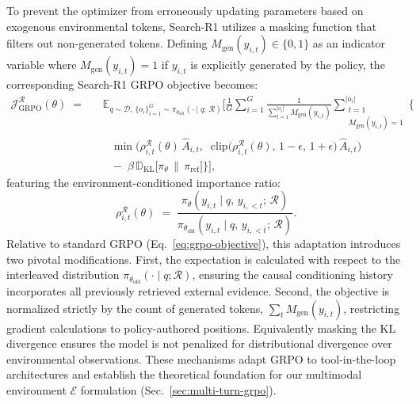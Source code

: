 To prevent the optimizer from erroneously updating parameters based on exogenous environmental tokens, Search-R1 utilizes a masking function that filters out non-generated tokens. Defining $M_{\text{gen}}(y_{i,t}) \in \{0, 1\}$ as an indicator variable where $M_{\text{gen}}(y_{i,t}) = 1$ if $y_{i,t}$ is explicitly generated by the policy, the corresponding Search-R1 GRPO objective becomes:
\begin{equation}
\begin{aligned}
    \mathcal{J}_{\text{GRPO}}^{\mathcal{R}}(\theta)
    \;=\;&\;\; \mathbb{E}_{q \sim \mathcal{D},\, \{o_i\}_{i=1}^{G} \sim \pi_{\theta_{\text{old}}}(\cdot\mid q;\,\mathcal{R})}
    \Bigg[
    \frac{1}{G} \sum_{i=1}^{G}
    \frac{1}{\sum_{t=1}^{|o_i|} M_{\text{gen}}(y_{i,t})}
    \sum_{\substack{t=1 \\ M_{\text{gen}}(y_{i,t})=1}}^{|o_i|} \bigg\{ \\
    &\quad\; \min\!\Big( \rho_{i,t}^{\mathcal{R}}(\theta)\,\hat{A}_{i,t},\;\;
    \mathrm{clip}\bigl(\rho_{i,t}^{\mathcal{R}}(\theta),\,1{-}\epsilon,\,1{+}\epsilon\bigr)\,\hat{A}_{i,t} \Big) \\
    &\quad\; -\; \beta\, \mathbb{D}_{\text{KL}}\!\bigl[\pi_\theta \,\|\, \pi_{\text{ref}}\bigr] \bigg\} \Bigg],
\end{aligned}
\label{eq:grpo-search}
\end{equation}
featuring the environment-conditioned importance ratio:
\begin{equation}
    \rho_{i,t}^{\mathcal{R}}(\theta) \;=\; \frac{\pi_\theta(y_{i,t} \mid q,\, y_{i,<t};\, \mathcal{R})}{\pi_{\theta_{\text{old}}}(y_{i,t} \mid q,\, y_{i,<t};\, \mathcal{R})}.
\end{equation}
Relative to standard GRPO (Eq.~\ref{eq:grpo-objective}), this adaptation introduces two pivotal modifications. First, the expectation is calculated with respect to the interleaved distribution $\pi_{\theta_{\text{old}}}(\cdot \mid q; \mathcal{R})$, ensuring the causal conditioning history incorporates all previously retrieved external evidence. Second, the objective is normalized strictly by the count of generated tokens, $\sum_t M_{\text{gen}}(y_{i,t})$, restricting gradient calculations to policy-authored positions. Equivalently masking the KL divergence ensures the model is not penalized for distributional divergence over environmental observations. These mechanisms adapt GRPO to tool-in-the-loop architectures and establish the theoretical foundation for our multimodal environment $\mathcal{E}$ formulation (Sec.~\ref{sec:multi-turn-grpo}).

